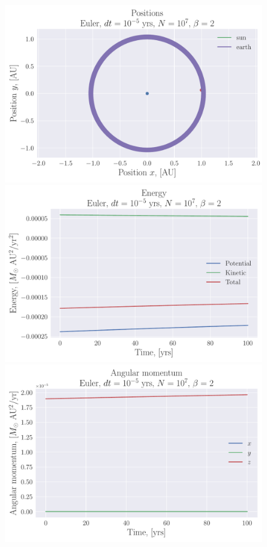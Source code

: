 \documentclass[reprint, english,notitlepage,nofootinbib]{revtex4-1}  %
\begin{document}
\begin{figure}
  \includegraphics[width=\linewidth]{../output/earth_sun_circ-euler-5-7-2.pdf}
  \includegraphics[width=\linewidth]{../output/earth_sun_circ-euler-5-7-2_energy.pdf}
  \includegraphics[width=\linewidth]{../output/earth_sun_circ-euler-5-7-2_ang_mom.pdf}
  \caption{}
  \label{fig:earth_sun_circ_euler}
\end{figure}
\end{document}
